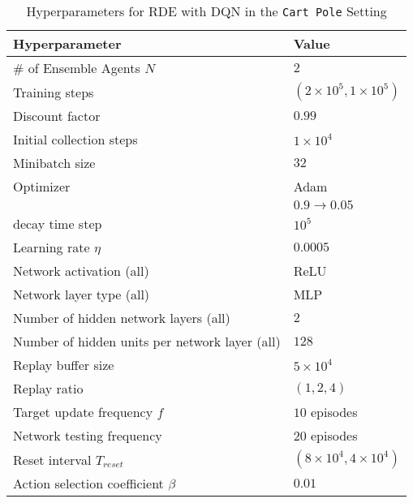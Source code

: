 \documentclass[base]{subfiles}
\begin{document}
\begin{table}[h]
	\caption{Hyperparameters for RDE with DQN in the \texttt{Cart Pole} Setting}
	\label{tab:cp_hyp}
	\centering
	\begin{tabular}{l|l}
		\toprule
		Hyperparameter                                 & Value                            \\
		\hline
		\# of Ensemble Agents $N$                      & $2$                              \\
		Training steps                                 & $(2 \times 10^5, 1 \times 10^5)$ \\
		Discount factor                                & $0.99$                           \\
		Initial collection steps                       & $1 \times 10^4$                  \\
		Minibatch size                                 & $32$                             \\
		Optimizer                                      & Adam                             \\
		\epsilon                                       & $0.9 \rightarrow 0.05$           \\
		\epsilon decay time step                       & $10^5$                           \\
		Learning rate $\eta$                           & $0.0005$                         \\
		Network activation (all)                       & ReLU                             \\
		Network layer type (all)                       & MLP                              \\
		Number of hidden network layers (all)          & $2$                              \\
		Number of hidden units per network layer (all) & $128$                            \\
		Replay buffer size                             & $5 \times 10^4$                  \\
		Replay ratio                                   & $(1,2,4)$                        \\
		Target update frequency $f$                    & $10$ episodes                    \\
		Network testing frequency                      & $20$ episodes                    \\
		Reset interval $T_{reset}$                     & $(8 \times 10^4, 4 \times 10^4)$ \\
		Action selection coefficient $\beta$           & $0.01$                           \\
		\bottomrule
	\end{tabular}
\end{table}
\end{document}
